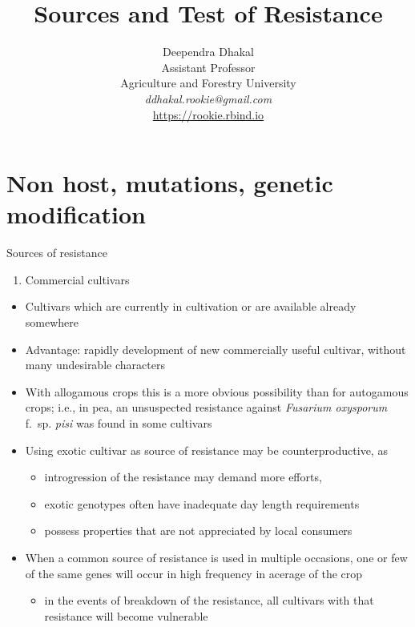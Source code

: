 \documentclass[11pt,dvipsnames,ignorenonframetext,aspectratio=169]{beamer}
\title[]{Sources and Test of Resistance}
\author[
        Deependra Dhakal\\
Assistant Professor\\
Agriculture and Forestry University\\
\textit{ddhakal.rookie@gmail.com}\\
\url{https://rookie.rbind.io}
    ]{Deependra Dhakal\\
Assistant Professor\\
Agriculture and Forestry University\\
\textit{ddhakal.rookie@gmail.com}\\
\url{https://rookie.rbind.io}}
\date[
      
  ]{
    }
\providecommand{\tightlist}{%
  \setlength{\itemsep}{0pt}\setlength{\parskip}{0pt}}
\begin{document}
  \begin{frame}[plain]
  \titlepage
  \end{frame}



\hypertarget{non-host-mutations-genetic-modification}{%
\section{Non host, mutations, genetic
modification}\label{non-host-mutations-genetic-modification}}

\begin{frame}{Sources of resistance}
\protect\hypertarget{sources-of-resistance}{}
\begin{enumerate}
\tightlist
\item
  Commercial cultivars
\end{enumerate}

\begin{itemize}
\tightlist
\item
  Cultivars which are currently in cultivation or are available already
  somewhere
\item
  Advantage: rapidly development of new commercially useful cultivar,
  without many undesirable characters
\item
  With allogamous crops this is a more obvious possibility than for
  autogamous crops; i.e., in pea, an unsuspected resistance against
  \textit{Fusarium oxysporum} f.~sp. \textit{pisi} was found in some
  cultivars
\item
  Using exotic cultivar as source of resistance may be
  counterproductive, as

  \begin{itemize}
  \footnotesize
  \item introgression of the resistance may demand more efforts,
  \item exotic genotypes often have inadequate day length requirements
  \item possess properties that are not appreciated by local consumers
  \end{itemize}
\item
  When a common source of resistance is used in multiple occasions, one
  or few of the same genes will occur in high frequency in acerage of
  the crop

  \begin{itemize}
  \footnotesize
  \item in the events of breakdown of the resistance, all cultivars with that resistance will become vulnerable
  \end{itemize}
\end{itemize}
\end{frame}
\end{document}
